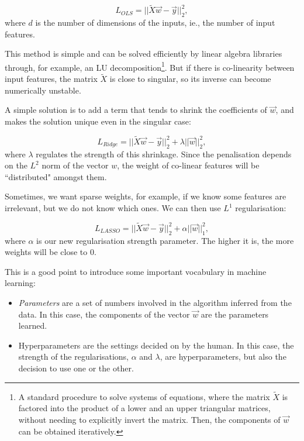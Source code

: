\begin{equation*}
 L_{OLS} = || \widetilde  X \vec w - \vec y ||_2 ^2,
\end{equation*}
where $d$ is the number of dimensions of the inputs, ie., the number of input features.

This method is simple and can be solved efficiently by linear algebra libraries through, for example, an LU decomposition\footnote{A standard procedure to solve systems of equations, where the matrix $\widetilde{X}$ is factored into the product of a lower and an upper triangular matrices, without needing to explicitly invert the matrix. Then, the components of $\vec w$ can be obtained iteratively.}.
But if there is co-linearity between input features, the matrix $ \widetilde X$ is close to singular, so its inverse can become numerically unstable.

A simple solution  is to add a term that tends to shrink the coefficients of $\vec w$, and makes the solution unique even in the singular case:

\[ L_{Ridge} = || \widetilde  X \vec w - \vec y ||_2 ^2 + \lambda ||\vec w||_2^2,\]
where $\lambda$ regulates the strength of this shrinkage.
Since the penalisation depends on the $L^2$ norm of the vector $w$, the weight of co-linear features will be ``distributed" amongst them.

Sometimes, we want sparse weights,  for example, if we know some features are irrelevant, but we do not know which ones.
We can then use $L^1$ regularisation:

\[ L_{LASSO} = || \widetilde X \vec w - \vec y ||_2 ^2 + \alpha ||\vec w||_1^2,\]
where $\alpha$ is our new regularisation strength parameter.
The higher it is, the more weights will be close to $0$.

This is a good point to introduce
some important vocabulary in machine learning:

\begin{itemize}
	\item \emph{Parameters} are a set of numbers involved in the algorithm inferred from the data.
	In this case, the components of the vector $\vec{w}$ are the parameters learned.
	\item {Hyperparameters} are the settings decided on by the human.
	In this case, the strength of the regularisations, $\alpha$ and $\lambda$, are hyperparameters, but also the decision to use one or the other.
\end{itemize}
 
